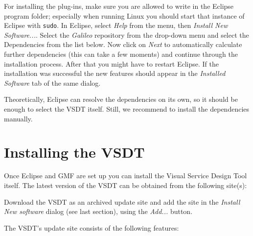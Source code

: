 For installing the plug-ins, make sure you are allowed to write in the Eclipse
program folder; especially when running Linux you should start that instance of
Eclipse with \texttt{sudo}.  In Eclipse, select \emph{Help} from the menu, then
\emph{Install New Software...}.  Select the \emph{Galileo} repository from the
drop-down menu and select the Dependencies from the list below.  Now click on
\emph{Next} to automatically calculate further dependencies (this can take a few
moments) and continue through the installation process.  After that you might
have to restart Eclipse.  If the installation was successful the new features
should appear in the \emph{Installed Software} tab of the same dialog.

Theoretically, Eclipse can resolve the dependencies on its own, so it should be
enough to select the VSDT itself.  Still, we recommend to install the dependencies
manually.



\section{Installing the VSDT}

Once Eclipse and GMF are set up you can install the Visual Service Design Tool
itself. The latest version of the VSDT can be obtained from the following site(s):
\begin{center}
	\downloadsites
\end{center}

Download the VSDT as an archived update site and add the site in the \emph{Install
New software} dialog (see last section), using the \emph{Add...} button.

The VSDT's update site consists of the following features:

